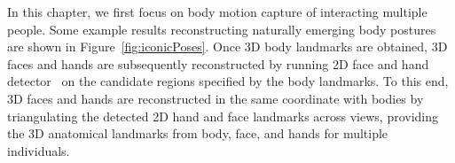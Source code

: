 In this chapter, we first focus on body motion capture of interacting multiple people. Some example results reconstructing naturally emerging body postures are shown in Figure~\ref{fig:iconicPoses}. Once 3D body landmarks are obtained, 3D faces and hands are subsequently reconstructed by running 2D face and hand detector~\cite{simon2017hand} on the candidate regions specified by the body landmarks. To this end, 3D faces and hands are reconstructed in the same coordinate with bodies by triangulating the detected 2D hand and face landmarks across views, providing the 3D anatomical landmarks from body, face, and hands for multiple individuals.


